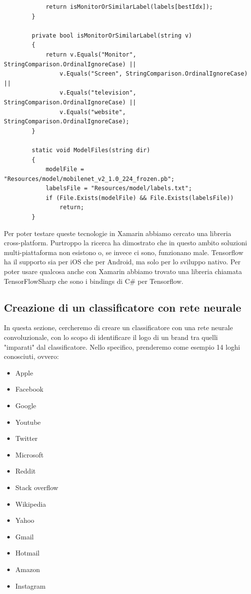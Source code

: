 \documentclass[twoside]{supsistudent}
\begin{document}
\begin{lstlisting}
            return isMonitorOrSimilarLabel(labels[bestIdx]);
        }

        private bool isMonitorOrSimilarLabel(string v)
        {
            return v.Equals("Monitor", StringComparison.OrdinalIgnoreCase) ||
                v.Equals("Screen", StringComparison.OrdinalIgnoreCase) ||
                v.Equals("television", StringComparison.OrdinalIgnoreCase) ||
                v.Equals("website", StringComparison.OrdinalIgnoreCase);
        }

        static void ModelFiles(string dir)
        {
            modelFile = "Resources/model/mobilenet_v2_1.0_224_frozen.pb";
            labelsFile = "Resources/model/labels.txt";
            if (File.Exists(modelFile) && File.Exists(labelsFile))
                return;
        }
\end{lstlisting}

Per poter testare queste tecnologie in Xamarin abbiamo cercato una libreria cross-platform. Purtroppo la ricerca ha dimostrato che in questo ambito soluzioni multi-piattaforma non esistono o, se invece ci sono, funzionano male. Tensorflow ha il supporto sia per iOS che per Android, ma solo per lo sviluppo nativo. 
Per poter usare qualcosa anche con Xamarin abbiamo trovato una libreria chiamata TensorFlowSharp che sono i bindings di C\# per Tensorflow.

\subsection{Creazione di un classificatore con rete neurale}
In questa sezione, cercheremo di creare un classificatore con una rete neurale convoluzionale, con lo scopo di identificare il logo di un brand tra quelli "imparati" dal classificatore. Nello specifico, prenderemo come esempio 14 loghi conosciuti, ovvero:
\begin{multicols}{3}
\begin{itemize}
\item Apple
\item Facebook
\item Google
\item Youtube
\item Twitter
\item Microsoft
\item Reddit
\item Stack overflow
\item Wikipedia
\item Yahoo
\item Gmail
\item Hotmail
\item Amazon
\item Instagram
\end{itemize}
\end{multicols}
\end{document}
